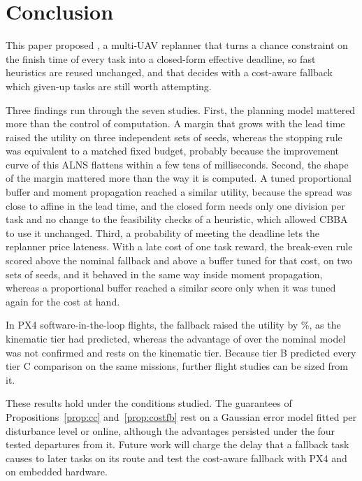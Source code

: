 \section{Conclusion}\label{sec:conclusion}\label{sec:discussion}
This paper proposed \mname{}, a multi-UAV replanner that turns a chance constraint on the finish time of every task
into a closed-form effective deadline, so fast heuristics are reused unchanged, and that decides with a cost-aware
fallback which given-up tasks are still worth attempting.

Three findings run through the seven studies. First, the planning model mattered more than the control of computation.
A margin that grows with the lead time raised the utility on three independent sets of seeds, whereas the stopping
rule was equivalent to a matched fixed budget, probably because the improvement curve of this ALNS flattens within a
few tens of milliseconds. Second, the shape of the margin mattered more than the way it is computed. A tuned
proportional buffer and moment propagation reached a similar utility, because the spread was close to affine in the
lead time, and the closed form needs only one division per task and no change to the feasibility checks of a
heuristic, which allowed CBBA to use it unchanged. Third, a probability of meeting the deadline lets the replanner
price lateness. With a late cost of one task reward, the break-even rule scored above the nominal fallback and above a
buffer tuned for that cost, on two sets of seeds, and it behaved in the same way inside moment propagation, whereas a
proportional buffer reached a similar score only when it was tuned again for the cost at hand.

In PX4 software-in-the-loop flights, the fallback raised the utility by \%, as the kinematic tier had
predicted, whereas the advantage of \mname{} over the nominal model was not confirmed and rests on the kinematic tier.
Because tier B predicted every tier C comparison on the same missions, further flight studies can be sized from it.

These results hold under the conditions studied. The guarantees of Propositions~\ref{prop:cc} and~\ref{prop:costfb}
rest on a Gaussian error model fitted per disturbance level or online, although the advantages persisted under the four
tested departures from it. Future work will charge the delay that a fallback task causes to later tasks on its route
and test the cost-aware fallback with PX4 and on embedded hardware.
